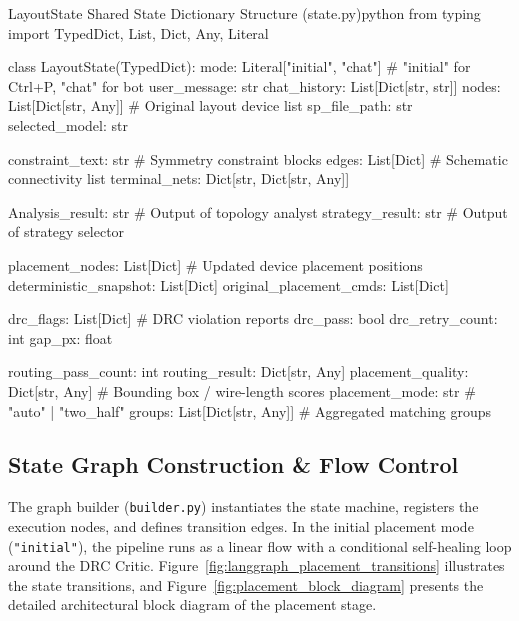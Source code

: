\begin{thesiscode}{LayoutState Shared State Dictionary Structure (state.py)}{python}
from typing import TypedDict, List, Dict, Any, Literal

class LayoutState(TypedDict):
    mode: Literal["initial", "chat"]       # "initial" for Ctrl+P, "chat" for bot
    user_message: str
    chat_history: List[Dict[str, str]]
    nodes: List[Dict[str, Any]]            # Original layout device list
    sp_file_path: str
    selected_model: str

    constraint_text: str                   # Symmetry constraint blocks
    edges: List[Dict]                      # Schematic connectivity list
    terminal_nets: Dict[str, Dict[str, Any]]

    Analysis_result: str                   # Output of topology analyst
    strategy_result: str                   # Output of strategy selector

    placement_nodes: List[Dict]            # Updated device placement positions
    deterministic_snapshot: List[Dict]
    original_placement_cmds: List[Dict]

    drc_flags: List[Dict]                  # DRC violation reports
    drc_pass: bool
    drc_retry_count: int
    gap_px: float

    routing_pass_count: int
    routing_result: Dict[str, Any]
    placement_quality: Dict[str, Any]      # Bounding box / wire-length scores
    placement_mode: str                     # "auto" | "two_half"
    groups: List[Dict[str, Any]]            # Aggregated matching groups
\end{thesiscode}

\subsection{State Graph Construction \& Flow Control}
The graph builder (\texttt{builder.py}) instantiates the state machine, registers the execution nodes, and defines transition edges. In the initial placement mode (\texttt{"initial"}), the pipeline runs as a linear flow with a conditional self-healing loop around the DRC Critic. Figure~\ref{fig:langgraph_placement_transitions} illustrates the state transitions, and Figure~\ref{fig:placement_block_diagram} presents the detailed architectural block diagram of the placement stage.

